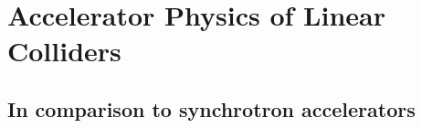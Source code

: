 \chapter{Accelerator Physics of Linear Colliders}
\label{LinearColliderPhysics}
\section{In comparison to synchrotron accelerators}
\label{ComparisonSynchrotons}
